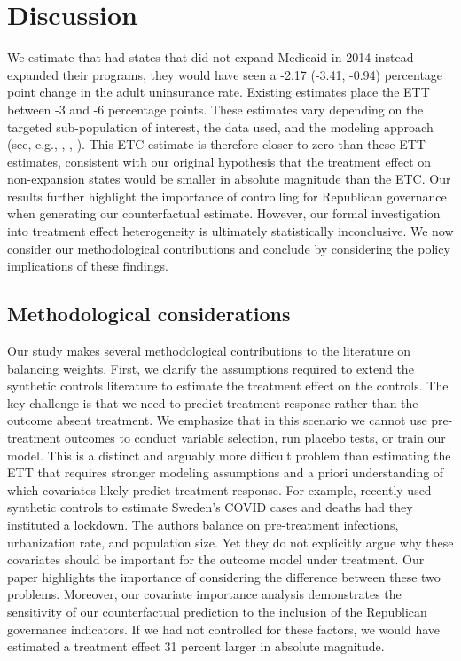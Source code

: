 \documentclass[aoas]{imsart}
\theoremstyle{plain}
\theoremstyle{remark}
\begin{document}
\section{Discussion}

We estimate that had states that did not expand Medicaid in 2014 instead expanded their programs, they would have seen a -2.17 (-3.41, -0.94) percentage point change in the adult uninsurance rate. Existing estimates place the ETT between -3 and -6 percentage points. These estimates vary depending on the targeted sub-population of interest, the data used, and the modeling approach (see, e.g., \cite{courtemanche2017early}, \cite{kaestner2017effects}, \cite{frean2017premium}). This ETC estimate is therefore closer to zero than these ETT estimates, consistent with our original hypothesis that the treatment effect on non-expansion states would be smaller in absolute magnitude than the ETC. Our results further highlight the importance of controlling for Republican governance when generating our counterfactual estimate. However, our formal investigation into treatment effect heterogeneity is ultimately statistically inconclusive. We now consider our methodological contributions and conclude by considering the policy implications of these findings.

\subsection{Methodological considerations}

Our study makes several methodological contributions to the literature on balancing weights. First, we clarify the assumptions required to extend the synthetic controls literature to estimate the treatment effect on the controls. The key challenge is that we need to predict treatment response rather than the outcome absent treatment. We emphasize that in this scenario we cannot use pre-treatment outcomes to conduct variable selection, run placebo tests, or train our model. This is a distinct and arguably more difficult problem than estimating the ETT that requires stronger modeling assumptions and a priori understanding of which covariates likely predict treatment response. For example, \cite{born2020lockdowns} recently used synthetic controls to estimate Sweden's COVID cases and deaths had they instituted a lockdown. The authors balance on pre-treatment infections, urbanization rate, and population size. Yet they do not explicitly argue why these covariates should be important for the outcome model under treatment. Our paper highlights the importance of considering the difference between these two problems. Moreover, our covariate importance analysis demonstrates the sensitivity of our counterfactual prediction to the inclusion of the Republican governance indicators. If we had not controlled for these factors, we would have estimated a treatment effect 31 percent larger in absolute magnitude.
\end{document}
